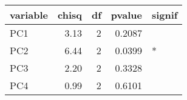 
\begin{tabular}{lrrrl}
\toprule
variable & chisq & df & pvalue & signif\\
\midrule
PC1 & 3.13 & 2 & 0.2087 & \\
PC2 & 6.44 & 2 & 0.0399 & *\\
PC3 & 2.20 & 2 & 0.3328 & \\
PC4 & 0.99 & 2 & 0.6101 & \\
\bottomrule
\end{tabular}
